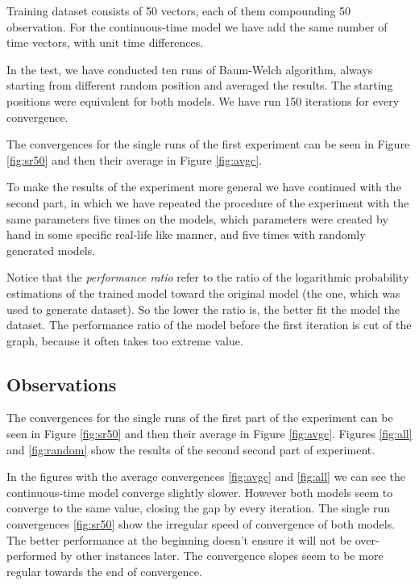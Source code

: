 \documentclass[thesis=M,english]{FITthesis}[2012/10/20]
\begin{document}
Training dataset consists of 50 vectors, each of them compounding 50 observation. For the continuous-time model we have add the same number of time vectors, with unit time differences.

In the test, we have conducted ten runs of Baum-Welch algorithm, always starting from different random position and averaged the results. The starting positions were equivalent for both models. We have run 150 iterations for every convergence.

The convergences for the single runs of the first experiment can be seen in Figure \ref{fig:sr50} and then their average in Figure \ref{fig:avgc}.

To make the results of the experiment more general we have continued with the second part, in which we have repeated the procedure of the experiment with the same parameters five times on the models, which parameters were created by hand in some specific real-life like manner, and five times with randomly generated models.

 

Notice that the \textit{performance ratio} refer to the ratio of the logarithmic probability estimations of the trained model toward the original model (the one, which was used to generate dataset). So the lower the ratio is, the better fit the model the dataset. The performance ratio of the model before the first iteration is cut of the graph, because it often takes too extreme value.

\subsection*{Observations }

The convergences for the single runs of the first part of the experiment can be seen
in Figure \ref{fig:sr50} and then their average in Figure \ref{fig:avgc}. Figures \ref{fig:all} and \ref{fig:random} show the results of the second second part of experiment.

In the figures with the average convergences \ref{fig:avgc} and \ref{fig:all} we can see the
continuous-time model converge slightly slower. However both models seem
to converge to the same value, closing the gap by every iteration.
The single run convergences \ref{fig:sr50} show the irregular speed of convergence of
both models. The better performance at the beginning doesn’t ensure it will
not be over-performed by other instances later. The convergence slopes seem
to be more regular towards the end of convergence.
\end{document}
